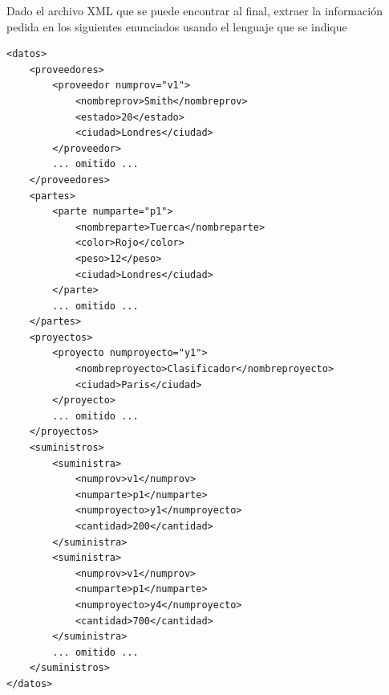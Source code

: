 \documentclass{examen}
\begin{document}

Dado el archivo XML que se puede encontrar al final, extraer la información pedida en los siguientes enunciados usando el lenguaje que se indique








\break 
\begin{verbatim}
<datos>
    <proveedores>
        <proveedor numprov="v1">
            <nombreprov>Smith</nombreprov>
            <estado>20</estado>
            <ciudad>Londres</ciudad>
        </proveedor>
        ... omitido ...
    </proveedores>
    <partes>
        <parte numparte="p1">
            <nombreparte>Tuerca</nombreparte>
            <color>Rojo</color>
            <peso>12</peso>
            <ciudad>Londres</ciudad>
        </parte>
        ... omitido ...
    </partes>
    <proyectos>
        <proyecto numproyecto="y1">
            <nombreproyecto>Clasificador</nombreproyecto>
            <ciudad>Paris</ciudad>
        </proyecto>
        ... omitido ...
    </proyectos>
    <suministros>
        <suministra>
            <numprov>v1</numprov>
            <numparte>p1</numparte>
            <numproyecto>y1</numproyecto>
            <cantidad>200</cantidad>
        </suministra>
        <suministra>
            <numprov>v1</numprov>
            <numparte>p1</numparte>
            <numproyecto>y4</numproyecto>
            <cantidad>700</cantidad>
        </suministra>
        ... omitido ...
    </suministros>
</datos>
\end{verbatim}
\end{document}
